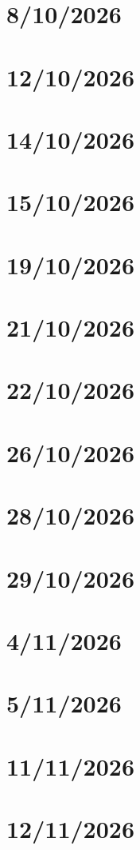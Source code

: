 \chapter{8/10/2026}

\chapter{12/10/2026}

\chapter{14/10/2026}

\chapter{15/10/2026}

\chapter{19/10/2026}

\chapter{21/10/2026}

\chapter{22/10/2026}

\chapter{26/10/2026}

\chapter{28/10/2026}

\chapter{29/10/2026}

\chapter{4/11/2026}

\chapter{5/11/2026}

\chapter{11/11/2026}

\chapter{12/11/2026}

